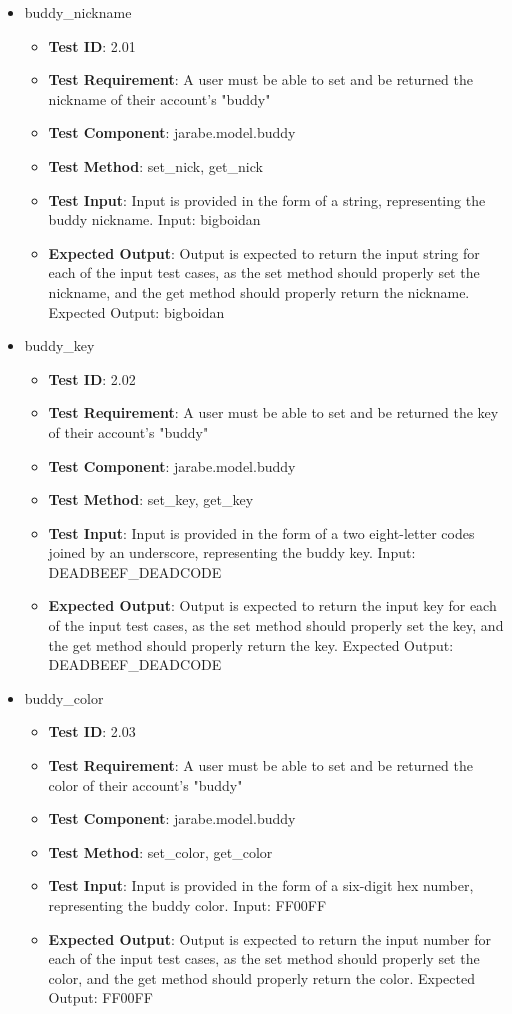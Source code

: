 \documentclass{article}
\begin{document}
\begin{itemize}[noitemsep]
\begin{itemize}[noitemsep,topsep=0pt]
\end{itemize}
\item buddy\_nickname
\begin{itemize}[noitemsep,topsep=0pt]
\item \textbf{Test ID}: 2.01
\item \textbf{Test Requirement}: A user must be able to set and be returned the nickname of their account's "buddy"
\item \textbf{Test Component}: jarabe.model.buddy
\item \textbf{Test Method}: set\_nick, get\_nick
\item \textbf{Test Input}: Input is provided in the form of a string, representing the buddy nickname. Input: bigboidan
\item \textbf{Expected Output}: Output is expected to return the input string for each of the input test cases, as the set method should properly set the nickname, and the get method should properly return the nickname. Expected Output: bigboidan
\end{itemize}
\item buddy\_key
\begin{itemize}[noitemsep,topsep=0pt]
\item \textbf{Test ID}: 2.02
\item \textbf{Test Requirement}: A user must be able to set and be returned the key of their account's "buddy"
\item \textbf{Test Component}: jarabe.model.buddy
\item \textbf{Test Method}: set\_key, get\_key
\item \textbf{Test Input}: Input is provided in the form of a two eight-letter codes joined by an underscore, representing the buddy key. Input: DEADBEEF\_DEADCODE
\item \textbf{Expected Output}: Output is expected to return the input key for each of the input test cases, as the set method should properly set the key, and the get method should properly return the key. Expected Output: DEADBEEF\_DEADCODE
\end{itemize}
\item buddy\_color
\begin{itemize}[noitemsep,topsep=0pt]
\item \textbf{Test ID}: 2.03
\item \textbf{Test Requirement}: A user must be able to set and be returned the color of their account's "buddy"
\item \textbf{Test Component}: jarabe.model.buddy
\item \textbf{Test Method}: set\_color, get\_color
\item \textbf{Test Input}: Input is provided in the form of a six-digit hex number, representing the buddy color. Input: FF00FF
\item \textbf{Expected Output}: Output is expected to return the input number for each of the input test cases, as the set method should properly set the color, and the get method should properly return the color. Expected Output: FF00FF
\end{itemize}
\end{itemize}
\end{document}
